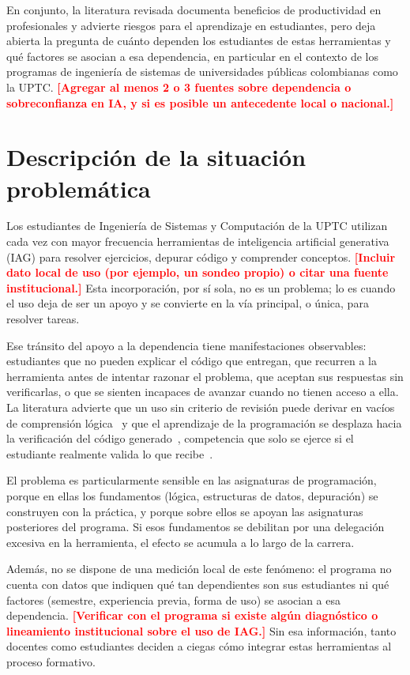 \documentclass[12pt,a4paper,oneside]{report}
\newcommand{\pendiente}[1]{\textcolor{red}{\textbf{[#1]}}}
\begin{document}
En conjunto, la literatura revisada documenta beneficios de productividad en profesionales y advierte riesgos para el aprendizaje en estudiantes, pero deja abierta la pregunta de cuánto dependen los estudiantes de estas herramientas y qué factores se asocian a esa dependencia, en particular en el contexto de los programas de ingeniería de sistemas de universidades públicas colombianas como la UPTC. \pendiente{Agregar al menos 2 o 3 fuentes sobre dependencia o sobreconfianza en IA, y si es posible un antecedente local o nacional.}

\section{Descripción de la situación problemática}

Los estudiantes de Ingeniería de Sistemas y Computación de la UPTC utilizan cada vez con mayor frecuencia herramientas de inteligencia artificial generativa (IAG) para resolver ejercicios, depurar código y comprender conceptos. \pendiente{Incluir dato local de uso (por ejemplo, un sondeo propio) o citar una fuente institucional.} Esta incorporación, por sí sola, no es un problema; lo es cuando el uso deja de ser un apoyo y se convierte en la vía principal, o única, para resolver tareas.

Ese tránsito del apoyo a la dependencia tiene manifestaciones observables: estudiantes que no pueden explicar el código que entregan, que recurren a la herramienta antes de intentar razonar el problema, que aceptan sus respuestas sin verificarlas, o que se sienten incapaces de avanzar cuando no tienen acceso a ella. La literatura advierte que un uso sin criterio de revisión puede derivar en vacíos de comprensión lógica~\cite{martinovic2024} y que el aprendizaje de la programación se desplaza hacia la verificación del código generado~\cite{prather2023}, competencia que solo se ejerce si el estudiante realmente valida lo que recibe~\cite{ieee2024}.

El problema es particularmente sensible en las asignaturas de programación, porque en ellas los fundamentos (lógica, estructuras de datos, depuración) se construyen con la práctica, y porque sobre ellos se apoyan las asignaturas posteriores del programa. Si esos fundamentos se debilitan por una delegación excesiva en la herramienta, el efecto se acumula a lo largo de la carrera.

Además, no se dispone de una medición local de este fenómeno: el programa no cuenta con datos que indiquen qué tan dependientes son sus estudiantes ni qué factores (semestre, experiencia previa, forma de uso) se asocian a esa dependencia. \pendiente{Verificar con el programa si existe algún diagnóstico o lineamiento institucional sobre el uso de IAG.} Sin esa información, tanto docentes como estudiantes deciden a ciegas cómo integrar estas herramientas al proceso formativo.
\end{document}
